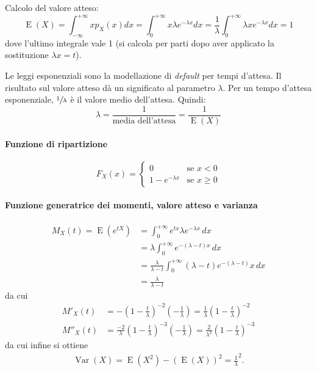 \documentclass[11pt,a4paper,twoside]{article}
\let\geq\geqslant%
\newcommand\dx{\,dx}
\DeclareMathOperator{\Var}{Var}
\DeclareMathOperator{\E}{E}
\begin{document}
Calcolo del valore atteso:
\[
  \E(X) = \int_{-\infty}^{+\infty} x p_X(x) dx = \int_0^{+\infty} x
  \lambda e^{-\lambda x} dx = \frac{1}{\lambda} \int_0^{+\infty}
  \lambda x e^{-\lambda x} dx = 1
\]
dove l'ultimo integrale vale 1 (si calcola per parti dopo aver
applicato la sostituzione \(\lambda x = t\)).

Le leggi esponenziali sono la modellazione di \textit{default} per
tempi d'attesa.  Il risultato sul valore atteso dà un significato al
parametro \(\lambda\). Per un tempo d'attesa esponenziale,
\(\sfrac{1}{\lambda}\) è il valore medio dell'attesa. Quindi:
\[
  \lambda = \frac{1}{\mbox{media dell'attesa}} = \frac{1}{\E(X)}
\]

\paragraph{Funzione di ripartizione}
\[
  F_X(x) = \begin{cases}
    0 &\mbox{se } x < 0 \\
    1-e^{-\lambda x} &\mbox{se } x\geq 0
  \end{cases}
\]

\paragraph{Funzione generatrice dei momenti, valore atteso e varianza}
\begin{align*}
  M_X(t) = \E(e^{tX})
  &= \int_0^{+\infty} e^{tx} \lambda e^{-\lambda x} \dx \\
  &= \lambda \int_0^{+\infty} e^{-(\lambda - t)x} \dx \\
  &= \frac{\lambda}{\lambda - t} \int_0^{+\infty} (\lambda -t)e^{-(\lambda -t)}x \dx \\
  &= \frac{\lambda}{\lambda -t}
\end{align*}
da cui
\begin{align*}
  M'_X(t)
  &= - \left( 1 - \frac{t}{\lambda} \right)^{-2}
    \left(-\frac{1}{\lambda}\right) =
    \frac{1}{\lambda} \left( 1 - \frac{t}{\lambda} \right)^{-2} \\
  M''_X(t)
  &= \frac{-2}{\lambda} \left( 1-\frac{t}{\lambda}
    \right)^{-3} \left( -\frac{1}{\lambda} \right) =
    \frac{2}{\lambda^2} \left( 1 - \frac{t}{\lambda} \right)^{-3}
\end{align*}
da cui infine si ottiene
\begin{align*}
  \Var(X) = \E(X^2) - (\E(X))^2 = \frac 1 \lambda^2 .
\end{align*}
\end{document}

